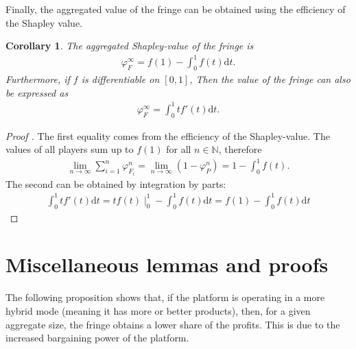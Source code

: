 \documentclass[a4paper]{article}
\newtheorem{corollary}{Corollary}
\newcommand{\dt}{\mathrm{d}t}
\begin{document}
Finally, the aggregated value of the fringe can be obtained using the efficiency of the Shapley value.

\begin{corollary}
    \label{cor:fringe_value}
    The aggregated Shapley-value of the fringe is
    \begin{align*}
        \varphi_F^\infty = f(1) - \int_0^1 f(t) \dt.
    \end{align*}
    Furthermore, if $f$ is differentiable on $[0, 1]$, Then the value of the fringe can also be expressed as
    \begin{align*}
        \varphi_F^\infty = \int_0^1 t f'(t) \dt.
    \end{align*}
\end{corollary}

\begin{proof}[Proof%
    ]
    The first equality comes from the efficiency of the Shapley-value. The values of all players sum up to $f(1)$ for all $n \in \mathbb{N}$, therefore
    \begin{align*}
        \lim_{n \to \infty} \sum_{i=1}^n \varphi_{F_i}^n = \lim_{n \to \infty} (1 - \varphi_P^n ) = 1 - \int_0^1 f(t).
    \end{align*}
    The second can be obtained by integration by parts:
    \begin{align*}
        \int_0^1 t f'(t) \dt = tf(t) \mid_0^1 - \int_0^1 f(t) \dt = f(1) - \int_0^1 f(t) \dt
    \end{align*}
\end{proof}


\section{Miscellaneous lemmas and proofs}

The following proposition shows that, if the platform is operating in a more hybrid mode (meaning it has more or better products), then, for a given aggregate size, the fringe obtains a lower share of the profits.
This is due to the increased bargaining power of the platform.
\end{document}
